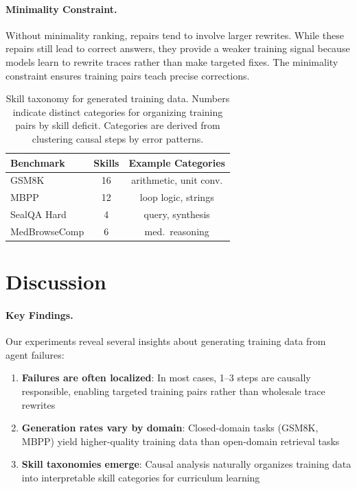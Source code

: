 \documentclass{article}
\theoremstyle{plain}
\theoremstyle{definition}
\theoremstyle{remark}
\begin{document}
\paragraph{Minimality Constraint.}
Without minimality ranking, repairs tend to involve larger rewrites. While these repairs still lead to correct answers, they provide a weaker training signal because models learn to rewrite traces rather than make targeted fixes. The minimality constraint ensures training pairs teach precise corrections.

\begin{table}[t]
  \caption{Skill taxonomy for generated training data. Numbers indicate distinct categories for organizing training pairs by skill deficit. Categories are derived from clustering causal steps by error patterns.}
  \label{tab:skills}
  \centering
  \begin{small}
    \begin{sc}
      \begin{tabular}{lcc}
        \toprule
        Benchmark & Skills & Example Categories \\
        \midrule
        GSM8K & 16 & arithmetic, unit conv. \\
        MBPP & 12 & loop logic, strings \\
        SealQA Hard & 4 & query, synthesis \\
        MedBrowseComp & 6 & med.\ reasoning \\
        \bottomrule
      \end{tabular}
    \end{sc}
  \end{small}
\end{table}

\section{Discussion}

\paragraph{Key Findings.}
Our experiments reveal several insights about generating training data from agent failures:
\begin{enumerate}
    \item \textbf{Failures are often localized}: In most cases, 1--3 steps are causally responsible, enabling targeted training pairs rather than wholesale trace rewrites
    \item \textbf{Generation rates vary by domain}: Closed-domain tasks (GSM8K, MBPP) yield higher-quality training data than open-domain retrieval tasks
    \item \textbf{Skill taxonomies emerge}: Causal analysis naturally organizes training data into interpretable skill categories for curriculum learning
\end{enumerate}
\end{document}
